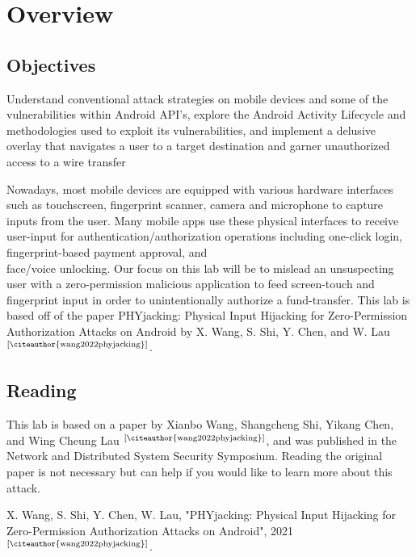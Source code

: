 \documentclass[letterpaper,12pt]{report}
\begin{document}

\section*{Overview}\label{sec:work-carried-out}

\subsection*{Objectives}

Understand conventional attack strategies on mobile devices and some of the vulnerabilities within Android API's, explore the Android Activity Lifecycle and methodologies used to exploit its vulnerabilities, and implement a delusive overlay that navigates a user to a target destination and garner unauthorized access to a wire transfer

\bigskip

Nowadays, most mobile devices are equipped with various hardware interfaces such as touchscreen, fingerprint scanner, camera and microphone to capture inputs from the user. Many mobile apps use these physical interfaces to receive user-input for authentication/authorization operations including one-click login, fingerprint-based payment approval, and \\face/voice unlocking. Our focus on this lab will be to mislead an unsuspecting user with a zero-permission malicious application to feed screen-touch and fingerprint input in order to unintentionally authorize a fund-transfer. This lab is based off of the paper PHYjacking: Physical Input Hijacking for Zero-Permission Authorization Attacks on Android by X. Wang, S. Shi, Y. Chen, and W. Lau $^\text{[\citeauthor{wang2022phyjacking}]}$.

\subsection*{Reading}

This lab is based on a paper by Xianbo Wang, Shangcheng Shi, Yikang Chen, and Wing Cheung Lau $^\text{[\citeauthor{wang2022phyjacking}]}$, and was published in the Network and Distributed System Security Symposium. Reading the original paper is not necessary but can help if you would like to learn more about this attack.

X. Wang, S. Shi, Y. Chen, W. Lau, "PHYjacking: Physical Input Hijacking for Zero-Permission Authorization Attacks on Android", 2021 $^\text{[\citeauthor{wang2022phyjacking}]}$.
\end{document}

